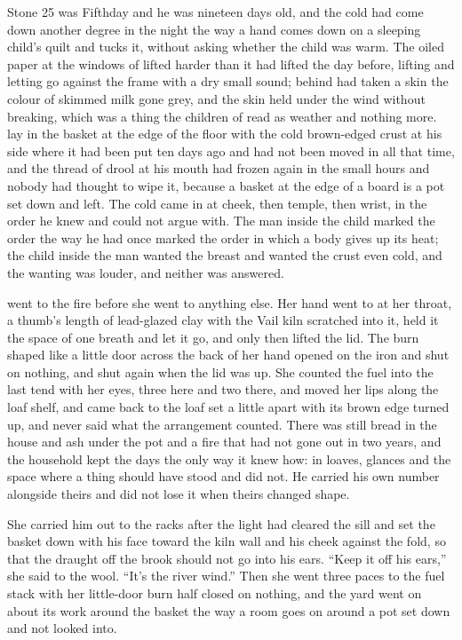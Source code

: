 
Stone 25 was Fifthday and he was nineteen days old, and the cold had come down another degree in the night the way a hand comes down on a sleeping child's quilt and tucks it, without asking whether the child was warm. The oiled paper at the windows of  lifted harder than it had lifted the day before, lifting and letting go against the frame with a dry small sound;  behind  had taken a skin the colour of skimmed milk gone grey, and the skin held under the wind without breaking, which was a thing the children of  read as weather and nothing more.  lay in the basket at the edge of the floor with the cold brown-edged crust at his side where it had been put ten days ago and had not been moved in all that time, and the thread of drool at his mouth had frozen again in the small hours and nobody had thought to wipe it, because a basket at the edge of a board is a pot set down and left. The cold came in at cheek, then temple, then wrist, in the order he knew and could not argue with. The man inside the child marked the order the way he had once marked the order in which a body gives up its heat; the child inside the man wanted the breast and wanted the crust even cold, and the wanting was louder, and neither was answered.

 went to the fire before she went to anything else. Her hand went to  at her throat, a thumb's length of lead-glazed clay with the Vail kiln scratched into it, held it the space of one breath and let it go, and only then lifted the lid. The burn shaped like a little door across the back of her hand opened on the iron and shut on nothing, and shut again when the lid was up. She counted the fuel into the last tend with her eyes, three here and two there, and moved her lips along the loaf shelf, and came back to the loaf set a little apart with its brown edge turned up, and never said what the arrangement counted. There was still bread in the house and ash under the pot and a fire that had not gone out in two years, and the household kept the days the only way it knew how: in loaves, glances and the space where a thing should have stood and did not. He carried his own number alongside theirs and did not lose it when theirs changed shape.

She carried him out to the racks after the light had cleared the sill and set the basket down with his face toward the kiln wall and his cheek against the fold, so that the draught off the brook should not go into his ears. “Keep it off his ears,” she said to the wool. “It's the river wind.” Then she went three paces to the fuel stack with her little-door burn half closed on nothing, and the yard went on about its work around the basket the way a room goes on around a pot set down and not looked into.

